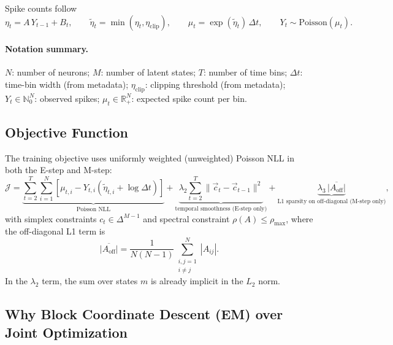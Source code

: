 \documentclass[11pt]{article}
\begin{document}
Spike counts follow
\begin{equation}
  \eta_t = A\,Y_{t-1} + B_t,\qquad
  \tilde{\eta}_t = \min(\eta_t,\eta_{\mathrm{clip}}),\qquad
  \mu_t = \exp(\tilde{\eta}_t)\,\Delta t,\qquad
  Y_t \sim \mathrm{Poisson}(\mu_t).
  \label{eq:glm}
\end{equation}

\paragraph{Notation summary.}
\(N\): number of neurons; 
\(M\): number of latent states; 
\(T\): number of time bins;
\(\Delta t\): time-bin width (from metadata);
\(\eta_{\mathrm{clip}}\): clipping threshold (from metadata);
\(Y_t \in \mathbb{N}_0^N\): observed spikes;
\(\mu_t \in \mathbb{R}_+^N\): expected spike count per bin.

\subsection{Objective Function}

The training objective uses uniformly weighted (unweighted) Poisson NLL in both the E-step and M-step:
\begin{equation}
\mathcal{J}
=
\underbrace{\sum_{t=2}^{T}\sum_{i=1}^{N}
\left[\mu_{t,i}-Y_{t,i}\left(\tilde{\eta}_{t,i}+\log\Delta t\right)\right]}_{\text{Poisson NLL}}
+
\underbrace{\lambda_2\sum_{t=2}^{T}\|\vec c_t- \vec c_{t-1}\|^2}_{\text{temporal smoothness (E-step only)}}
+
\underbrace{\lambda_3\,\overline{|A_{\mathrm{off}}|}}_{\text{L1 sparsity on off-diagonal (M-step only)}},
\label{eq:objective}
\end{equation}
with simplex constraints \(c_t\in\Delta^{M-1}\) and spectral constraint
\(\rho(A)\le \rho_{\max}\), where the off-diagonal L1 term is
\begin{equation}
  \overline{|A_{\mathrm{off}}|}
  =
  \frac{1}{N(N-1)}
  \sum_{\substack{i,j=1\\i\neq j}}^{N}|A_{ij}|.
  \label{eq:l1_offdiag}
\end{equation}
In the $\lambda_2$ term, the sum over states $m$
is already implicit in the $L_2$ norm.


\subsection{Why Block Coordinate Descent (EM) over Joint Optimization}
\end{document}

